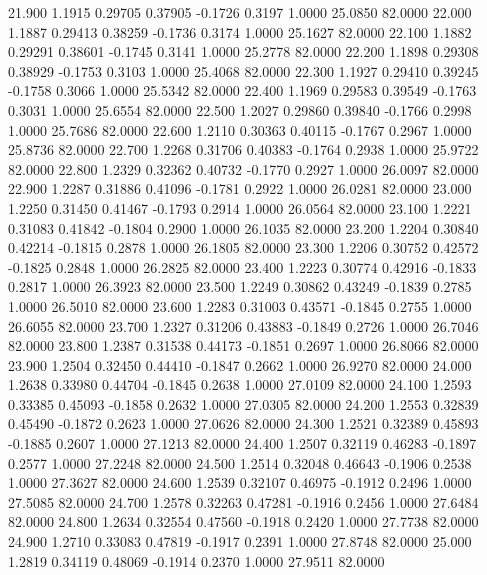   21.900   1.1915   0.29705   0.37905  -0.1726   0.3197   1.0000  25.0850  82.0000
  22.000   1.1887   0.29413   0.38259  -0.1736   0.3174   1.0000  25.1627  82.0000
  22.100   1.1882   0.29291   0.38601  -0.1745   0.3141   1.0000  25.2778  82.0000
  22.200   1.1898   0.29308   0.38929  -0.1753   0.3103   1.0000  25.4068  82.0000
  22.300   1.1927   0.29410   0.39245  -0.1758   0.3066   1.0000  25.5342  82.0000
  22.400   1.1969   0.29583   0.39549  -0.1763   0.3031   1.0000  25.6554  82.0000
  22.500   1.2027   0.29860   0.39840  -0.1766   0.2998   1.0000  25.7686  82.0000
  22.600   1.2110   0.30363   0.40115  -0.1767   0.2967   1.0000  25.8736  82.0000
  22.700   1.2268   0.31706   0.40383  -0.1764   0.2938   1.0000  25.9722  82.0000
  22.800   1.2329   0.32362   0.40732  -0.1770   0.2927   1.0000  26.0097  82.0000
  22.900   1.2287   0.31886   0.41096  -0.1781   0.2922   1.0000  26.0281  82.0000
  23.000   1.2250   0.31450   0.41467  -0.1793   0.2914   1.0000  26.0564  82.0000
  23.100   1.2221   0.31083   0.41842  -0.1804   0.2900   1.0000  26.1035  82.0000
  23.200   1.2204   0.30840   0.42214  -0.1815   0.2878   1.0000  26.1805  82.0000
  23.300   1.2206   0.30752   0.42572  -0.1825   0.2848   1.0000  26.2825  82.0000
  23.400   1.2223   0.30774   0.42916  -0.1833   0.2817   1.0000  26.3923  82.0000
  23.500   1.2249   0.30862   0.43249  -0.1839   0.2785   1.0000  26.5010  82.0000
  23.600   1.2283   0.31003   0.43571  -0.1845   0.2755   1.0000  26.6055  82.0000
  23.700   1.2327   0.31206   0.43883  -0.1849   0.2726   1.0000  26.7046  82.0000
  23.800   1.2387   0.31538   0.44173  -0.1851   0.2697   1.0000  26.8066  82.0000
  23.900   1.2504   0.32450   0.44410  -0.1847   0.2662   1.0000  26.9270  82.0000
  24.000   1.2638   0.33980   0.44704  -0.1845   0.2638   1.0000  27.0109  82.0000
  24.100   1.2593   0.33385   0.45093  -0.1858   0.2632   1.0000  27.0305  82.0000
  24.200   1.2553   0.32839   0.45490  -0.1872   0.2623   1.0000  27.0626  82.0000
  24.300   1.2521   0.32389   0.45893  -0.1885   0.2607   1.0000  27.1213  82.0000
  24.400   1.2507   0.32119   0.46283  -0.1897   0.2577   1.0000  27.2248  82.0000
  24.500   1.2514   0.32048   0.46643  -0.1906   0.2538   1.0000  27.3627  82.0000
  24.600   1.2539   0.32107   0.46975  -0.1912   0.2496   1.0000  27.5085  82.0000
  24.700   1.2578   0.32263   0.47281  -0.1916   0.2456   1.0000  27.6484  82.0000
  24.800   1.2634   0.32554   0.47560  -0.1918   0.2420   1.0000  27.7738  82.0000
  24.900   1.2710   0.33083   0.47819  -0.1917   0.2391   1.0000  27.8748  82.0000
  25.000   1.2819   0.34119   0.48069  -0.1914   0.2370   1.0000  27.9511  82.0000
